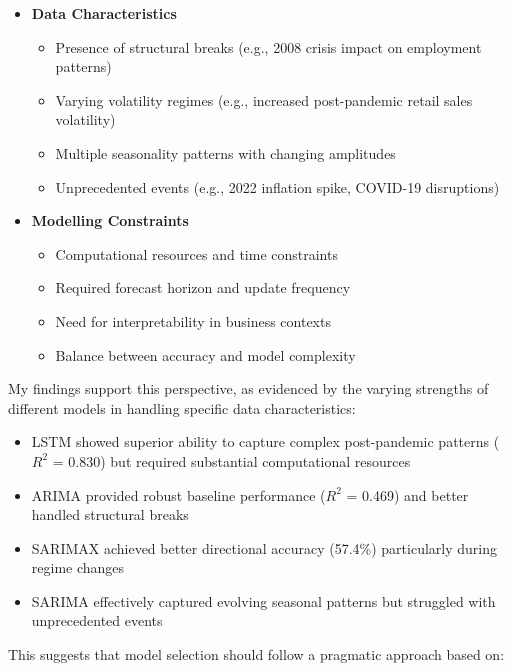 \documentclass[12pt,a4paper]{report}
\begin{document}
\begin{itemize}
    \item \textbf{Data Characteristics}
    \begin{itemize}
        \item Presence of structural breaks (e.g., 2008 crisis impact on employment patterns)
        \item Varying volatility regimes (e.g., increased post-pandemic retail sales volatility)
        \item Multiple seasonality patterns with changing amplitudes
        \item Unprecedented events (e.g., 2022 inflation spike, COVID-19 disruptions)
    \end{itemize}
    
    \item \textbf{Modelling Constraints}
    \begin{itemize}
        \item Computational resources and time constraints
        \item Required forecast horizon and update frequency
        \item Need for interpretability in business contexts
        \item Balance between accuracy and model complexity
    \end{itemize}
\end{itemize}

My findings support this perspective, as evidenced by the varying strengths of different models in handling specific data characteristics:

\begin{itemize}
    \item LSTM showed superior ability to capture complex post-pandemic patterns ($R^2$ = 0.830) but required substantial computational resources
    \item ARIMA provided robust baseline performance ($R^2$ = 0.469) and better handled structural breaks
    \item SARIMAX achieved better directional accuracy (57.4\%) particularly during regime changes
    \item SARIMA effectively captured evolving seasonal patterns but struggled with unprecedented events
\end{itemize}

This suggests that model selection should follow a pragmatic approach based on:
\end{document}
